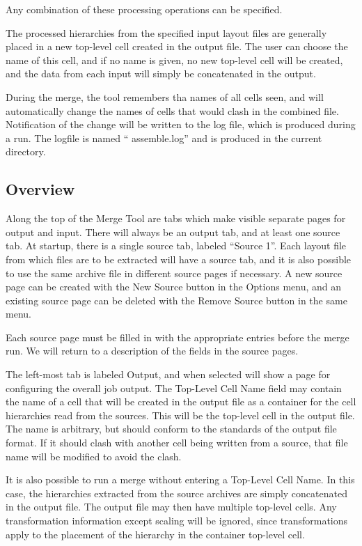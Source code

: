 Any combination of these processing operations can be specified.

The processed hierarchies from the specified input layout files are
generally placed in a new top-level cell created in the output file. 
The user can choose the name of this cell, and if no name is given, no
new top-level cell will be created, and the data from each input will
simply be concatenated in the output.

During the merge, the tool remembers tha names of all cells seen, and
will automatically change the names of cells that would clash in the
combined file.  Notification of the change will be written to the log
file, which is produced during a run.  The logfile is named ``{\vt
assemble.log}'' and is produced in the current directory.

\subsection{Overview}

Along the top of the {\cb Merge Tool} are tabs which make visible
separate pages for output and input.  There will always be an output
tab, and at least one source tab.  At startup, there is a single
source tab, labeled ``Source 1''.  Each layout file from which files
are to be extracted will have a source tab, and it is also possible to
use the same archive file in different source pages if necessary.  A
new source page can be created with the {\cb New Source} button in the
{\cb Options} menu, and an existing source page can be deleted with
the {\cb Remove Source} button in the same menu.

Each source page must be filled in with the appropriate entries before
the merge run.  We will return to a description of the fields in the
source pages.

The left-most tab is labeled {\cb Output}, and when selected will show
a page for configuring the overall job output.  The {\cb Top-Level
Cell Name} field may contain the name of a cell that will be created
in the output file as a container for the cell hierarchies read from
the sources.  This will be the top-level cell in the output file.  The
name is arbitrary, but should conform to the standards of the output
file format.  If it should clash with another cell being written from
a source, that file name will be modified to avoid the clash.

It is also possible to run a merge without entering a {\cb Top-Level
Cell Name}.  In this case, the hierarchies extracted from the source
archives are simply concatenated in the output file.  The output file
may then have multiple top-level cells.  Any transformation
information except scaling will be ignored, since transformations
apply to the placement of the hierarchy in the container top-level
cell.

